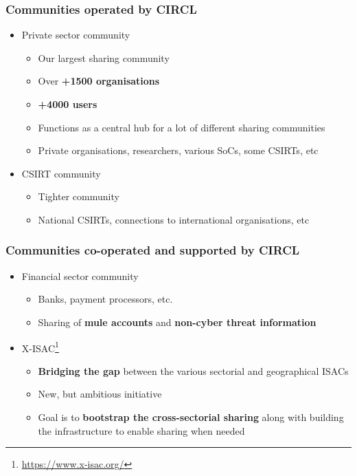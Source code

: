 \begin{frame}
\frametitle{Communities operated by CIRCL}
\begin{itemize}
        \item Private sector community
	\begin{itemize}
		\item Our largest sharing community
		\item Over {\bf +1500 organisations}
		\item {\bf +4000 users}
		\item Functions as a central hub for a lot of different sharing communities
		\item Private organisations, researchers, various SoCs, some CSIRTs, etc
	\end{itemize}
	\item CSIRT community
	\begin{itemize}
		\item Tighter community
		\item National CSIRTs, connections to international organisations, etc
	\end{itemize}
\end{itemize}
\end{frame}

\begin{frame}
\frametitle{Communities co-operated and supported by CIRCL}
\begin{itemize}
	\item Financial sector community
	\begin{itemize}
		\item Banks, payment processors, etc.
		\item Sharing of {\bf mule accounts} and {\bf non-cyber threat information}
	\end{itemize}
    \item X-ISAC\footnote{\url{https://www.x-isac.org/}}
	\begin{itemize}
		\item {\bf Bridging the gap} between the various sectorial and geographical ISACs
		\item New, but ambitious initiative
		\item Goal is to {\bf bootstrap the cross-sectorial sharing} along with building the infrastructure to enable sharing when needed
	\end{itemize}
\end{itemize}
\end{frame}

